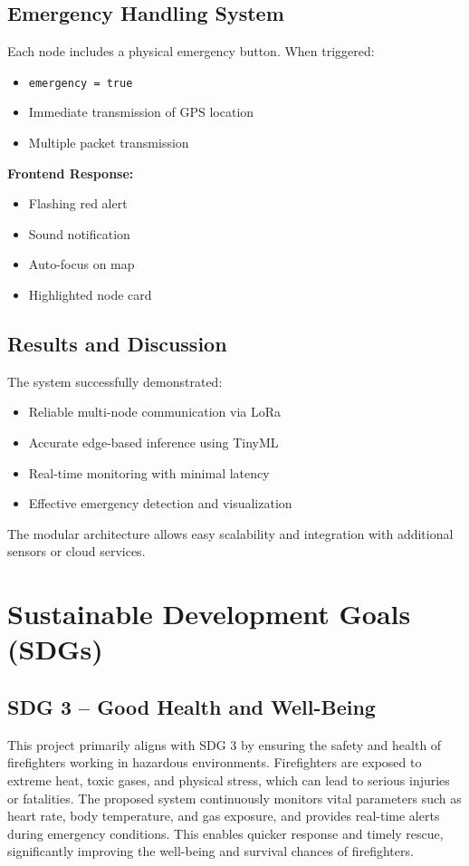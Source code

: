 \documentclass[12pt,a4paper]{article}
\begin{document}
	\subsection{Emergency Handling System}
	Each node includes a physical emergency button. When triggered:
	\begin{itemize}
		\item \texttt{emergency = true}
		\item Immediate transmission of GPS location
		\item Multiple packet transmission
	\end{itemize}
	
	\noindent\textbf{Frontend Response:}
	\begin{itemize}
		\item Flashing red alert
		\item Sound notification
		\item Auto-focus on map
		\item Highlighted node card
	\end{itemize}
	
	\subsection{Results and Discussion}
	The system successfully demonstrated:
	\begin{itemize}
		\item Reliable multi-node communication via LoRa
		\item Accurate edge-based inference using TinyML
		\item Real-time monitoring with minimal latency
		\item Effective emergency detection and visualization
	\end{itemize}
	The modular architecture allows easy scalability and integration with additional sensors or cloud services.
	
	\section{Sustainable Development Goals (SDGs)}
	
	\subsection{SDG 3 -- Good Health and Well-Being}
	This project primarily aligns with SDG 3 by ensuring the safety and health of firefighters working in hazardous environments. Firefighters are exposed to extreme heat, toxic gases, and physical stress, which can lead to serious injuries or fatalities. The proposed system continuously monitors vital parameters such as heart rate, body temperature, and gas exposure, and provides real-time alerts during emergency conditions. This enables quicker response and timely rescue, significantly improving the well-being and survival chances of firefighters.
	
\end{document}
